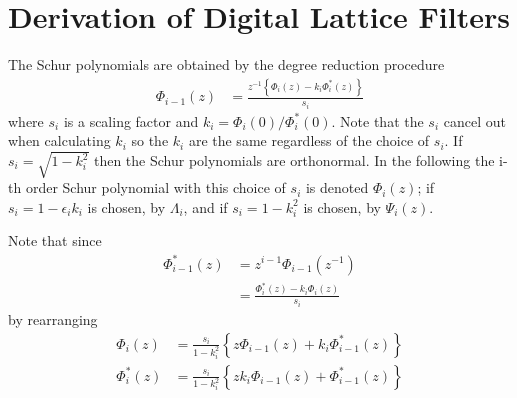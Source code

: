 \documentclass[a4paper,twoside,10pt,english]{report}
\begin{document}
\section{Derivation of Digital Lattice Filters}
The Schur polynomials are obtained by the degree reduction procedure
\begin{align}
\Phi_{i-1}\left(z\right) & = \frac{z^{-1}\left\{ \Phi_{i}\left(z\right)-k_{i}\Phi_{i}^{*}\left(z\right)\right\} }{s_{i}}\label{eq:SchurDegreeReduction}
\end{align}
where $s_{i}$ is a scaling factor and $k_{i}=\Phi_{i}\left(0\right)/\Phi_{i}^{*}\left(0\right)$. Note that the $s_{i}$ cancel out when calculating $k_{i}$ so the
$k_{i}$ are the same regardless of the choice of $s_{i}$.
If $s_{i}=\sqrt{1-k_{i}^{2}}$ then the Schur polynomials are orthonormal.
In the following the i-th order Schur polynomial with this choice
of $s_{i}$ is denoted $\Phi_{i}\left(z\right)$; if $s_{i}=1-\epsilon_{i}k_{i}$
is chosen, by $\Lambda_{i}$, and if $s_{i}=1-k_{i}^{2}$ is chosen,
by $\Psi_{i}\left(z\right)$. 

Note that since 
\begin{align*}
\Phi_{i-1}^{*}\left(z\right) & = z^{i-1}\Phi_{i-1}\left(z^{-1}\right)\\
 & = \frac{\Phi_{i}^{*}\left(z\right)-k_{i}\Phi_{i}\left(z\right)}{s_{i}}
\end{align*}
by rearranging
\begin{align*}
\Phi_{i}\left(z\right) & = \frac{s_{i}}{1-k_{i}^{2}}\left\{ z\Phi_{i-1}\left(z\right)+k_{i}\Phi_{i-1}^{*}\left(z\right)\right\} \\
\Phi_{i}^{*}\left(z\right) & = \frac{s_{i}}{1-k_{i}^{2}}\left\{ zk_{i}\Phi_{i-1}\left(z\right)+\Phi_{i-1}^{*}\left(z\right)\right\} 
\end{align*}
\end{document}
